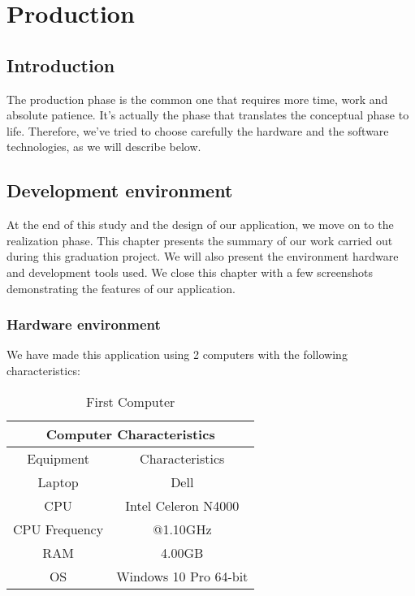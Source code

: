 \documentclass[12pt]{report}
\begin{document}
\chapter{Production}
\renewcommand{\thesection}{\arabic{section}}
\section*{Introduction}
The production phase is the common one that requires more time, work and absolute patience. It's actually the phase that translates the conceptual phase to life. Therefore, we've tried to choose carefully the hardware and the software technologies, as we will describe below. 
\section{Development environment}
At the end of this study and the design of our application, we move on to the realization phase. This chapter presents the summary of our work carried out during this graduation project. We will also present the environment hardware and development tools used. We close this chapter with a few screenshots demonstrating the features of our application.
\subsection{Hardware environment}
We have made this application using 2 computers with the following characteristics:

\begin{table}[!htbp]
    \centering
    \begin{tabular}{|c|c|}
    \hline
    \hline
      \multicolumn{2}{|c|}{Computer Characteristics} \\
        \hline
        \hline
    
        Equipment &  Characteristics \\ \hline
        Laptop &  Dell \\ \hline
        CPU &  Intel Celeron N4000 \\ \hline
        CPU Frequency &  @1.10GHz \\ \hline
        RAM &  4.00GB \\ \hline
        OS &  Windows 10 Pro 64-bit \\ \hline
        
    \end{tabular}
    \caption{First Computer}
    \label{tab:pc1}
\end{table}
\end{document}
